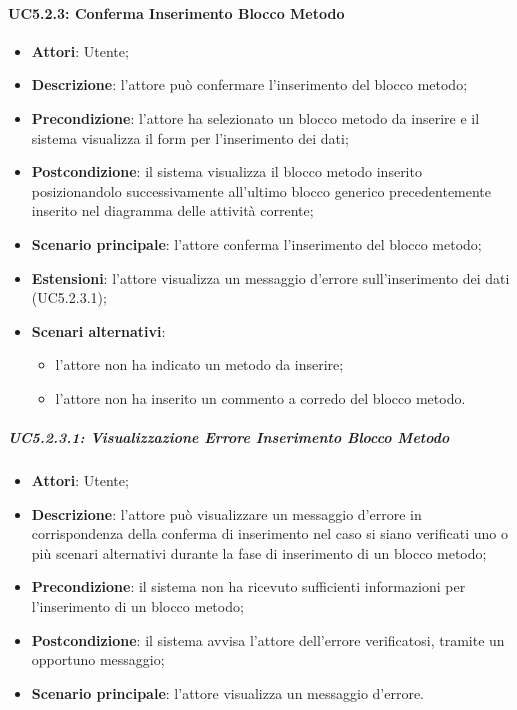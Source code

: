 \begin{itemize}
\begin{itemize}
\begin{itemize}
\begin{itemize}
\paragraph{UC5.2.3: Conferma Inserimento Blocco Metodo}
\label{UC5.2.3}
\begin{itemize}
	\item \textbf{Attori}: Utente;
	\item \textbf{Descrizione}: l'attore può confermare l'inserimento del blocco metodo;
	\item \textbf{Precondizione}: l'attore ha selezionato un blocco metodo da inserire e il sistema visualizza il form per l'inserimento dei dati;
	\item \textbf{Postcondizione}: il sistema visualizza il blocco metodo inserito posizionandolo successivamente all'ultimo blocco generico precedentemente inserito nel diagramma delle attività corrente;	
	\item \textbf{Scenario principale}: l'attore conferma l'inserimento del blocco metodo;
	\item \textbf{Estensioni}: l'attore visualizza un messaggio d'errore sull'inserimento dei dati (UC5.2.3.1);
	\item \textbf{Scenari alternativi}:
	\begin{itemize}
		\item l'attore non ha indicato un metodo da inserire;
		\item l'attore non ha inserito un commento a corredo del blocco metodo.
	\end{itemize}
\end{itemize}

\subparagraph{UC5.2.3.1: Visualizzazione Errore Inserimento Blocco Metodo}
\label{UC5.2.3.1}
\begin{itemize}
	\item \textbf{Attori}: Utente;
	\item \textbf{Descrizione}: l'attore può visualizzare un messaggio d'errore in corrispondenza della conferma di inserimento nel caso si siano verificati uno o più scenari alternativi durante la fase di inserimento di un blocco metodo;
	\item \textbf{Precondizione}: il sistema non ha ricevuto sufficienti informazioni per l'inserimento di un blocco metodo;
	\item \textbf{Postcondizione}: il sistema avvisa l'attore dell'errore verificatosi, tramite un opportuno messaggio;
	\item \textbf{Scenario principale}: l'attore visualizza un messaggio d'errore.
\end{itemize}


\end{itemize}
\end{itemize}
\end{itemize}
\end{itemize}
